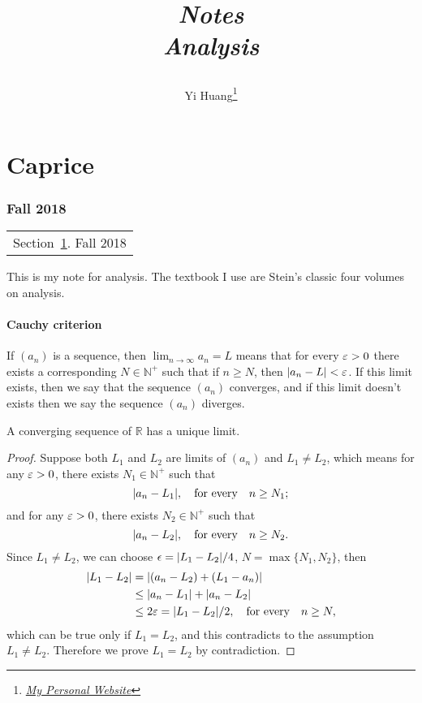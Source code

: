 \documentclass[10pt]{article}
\title{\begin{center}{\Huge \textit{Notes}}\\{{\itshape Analysis}}\end{center}}
\author{Yi Huang\footnote{\href{https://yiihuang.com/}{\textit{My Personal Website}}}}
\affiliation{
University of Minnesota
}
\begin{document}
	\maketitle
	\flushbottom
	\newpage
	\pagestyle{fancynotes}
	\part{Caprice}
	\section{Fall 2018}\label{sec:fall2018}
	\begin{margintable}\vspace{.8in}\footnotesize
		\begin{tabularx}{\marginparwidth}{|X}
		Section~\ref{sec:fall2018}. Fall 2018\\
		\end{tabularx}
	\end{margintable}

	This is my note for analysis. The textbook I use are Stein's classic four volumes on analysis.

	\subsection{Cauchy criterion}

	\begin{definition}
		If $(a_n)$ is a sequence, then $\lim_{n \to \infty} a_n = L$ means that for every $\varepsilon > 0$ there exists a corresponding $N \in \mathbb{N}^+$ such that if $n \ge N$, then $\abs{a_n - L} < \varepsilon$. If this limit exists, then we say that the sequence $(a_n)$ converges, and if this limit doesn't exists then we say the sequence $(a_n)$ diverges.
	\end{definition}
	\begin{proposition}
		A converging sequence of $\mathbb{R}$ has a unique limit.
	\end{proposition}
	\begin{proof}
		Suppose both $L_1$ and $L_2$ are limits of $(a_n)$ and $L_1 \neq L_2$, which means for any $\varepsilon > 0$, there exists $N_1 \in \mathbb{N}^+$ such that
		\begin{equation}
			\abs{a_n - L_1}, \qq{for every} n \ge N_1;
		\end{equation}
		and for any $\varepsilon > 0$, there exists $N_2 \in \mathbb{N}^+$ such that
		\begin{equation}
			\abs{a_n - L_2}, \qq{for every} n \ge N_2.
		\end{equation}
		Since $L_1 \neq L_2$, we can choose $\epsilon = \abs{L_1 - L_2}/4$, $N = \max \{ N_1, N_2 \}$, then
		\begin{align*}
			\abs{L_1 - L_2} &= \abs{(a_n - L_2) + (L_1 - a_n)} \\
			&\le \abs{a_n - L_1} + \abs{a_n - L_2} \\
			&\le 2 \veps = \abs{L_1 - L_2}/2, \qq{for every} n \ge N,
		\end{align*}
		which can be true only if $L_1 = L_2$, and this contradicts to the assumption $L_1 \neq L_2$. Therefore we prove $L_1 = L_2$ by contradiction.
	\end{proof}
\end{document}
